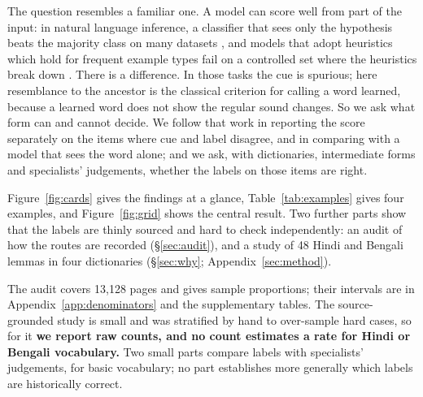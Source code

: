 \documentclass[11pt]{article}
\begin{document}
The question resembles a familiar one. A model can score well from part of the input: in natural language inference, a classifier that sees only the hypothesis beats the majority class on many datasets \citep{poliak2018hypothesis,gururangan2018annotation}, and models that adopt heuristics which hold for frequent example types fail on a controlled set where the heuristics break down \citep{mccoy2019right}. There is a difference. In those tasks the cue is spurious; here resemblance to the ancestor is the classical criterion for calling a word learned, because a learned word does not show the regular sound changes. So we ask what form can and cannot decide. We follow that work in reporting the score separately on the items where cue and label disagree, and in comparing with a model that sees the word alone; and we ask, with dictionaries, intermediate forms and specialists' judgements, whether the labels on those items are right.

Figure~\ref{fig:cards} gives the findings at a glance, Table~\ref{tab:examples} gives four examples, and Figure~\ref{fig:grid} shows the central result. Two further parts show that the labels are thinly sourced and hard to check independently: an audit of how the routes are recorded (\S\ref{sec:audit}), and a study of 48 Hindi and Bengali lemmas in four dictionaries (\S\ref{sec:why}; Appendix~\ref{sec:method}).

The audit covers 13,128 pages and gives sample proportions; their intervals are in Appendix~\ref{app:denominators} and the supplementary tables. The source-grounded study is small and was stratified by hand to over-sample hard cases, so for it \textbf{we report raw counts, and no count estimates a rate for Hindi or Bengali vocabulary.} Two small parts compare labels with specialists' judgements, for basic vocabulary; no part establishes more generally which labels are historically correct.
\end{document}
